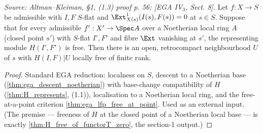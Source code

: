 \begin{theorem}
  \label{thm:ega_reduce_H_locallyFree}
  \textit{Source: Altman--Kleiman, §1, (1.3) proof p. 56; [EGA IV$_3$, Sect. 8].}
  Let $f : X \to S$ be admissible with $I, F$ $S$-flat and
  $\Ext^1_{X(s)}(I(s),F(s)) = 0$ at $s \in S$. Suppose that for every admissible
  $f' : X' \to \Spec A$ over a Noetherian local ring $A$ (closed point $s'$) with
  $S$-flat $I', F'$ and fibre $\Ext$ vanishing at $s'$, the representing module
  $H(I',F')$ is free. Then there is an open, retrocompact neighbourhood $U$ of $s$
  with $H(I,F)|U$ locally free of finite rank.
  \begin{proof}
    Standard EGA reduction: localness on $S$, descent to a Noetherian base
    (\cref{thm:ega_descent_noetherian}) with base-change compatibility of $H$
    (\cref{thm:H_represents}, (1.1)), localisation to a Noetherian local ring, and
    the free-at-a-point criterion \cref{thm:ega_lfp_free_at_point}. Used as an
    external input. (The premise — freeness of $H$ at the closed point of a
    Noetherian local base — is exactly \cref{thm:H_free_of_functorT_zero}, the
    section-1 output.)
  \end{proof}
\end{theorem}

